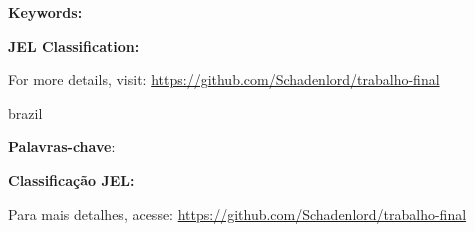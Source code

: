 \documentclass[
	article,
	12pt,
	oneside,
	a4paper,
	english,
	brazil,
	sumario=tradicional
]{abntex2}
\begin{document}
\frenchspacing

\maketitle
{}

	\begin{resumoumacoluna}
	\noindent
	
	
	\textbf{Keywords:} 
	
	\textbf{JEL Classification: }

	For more details, visit: \url{https://github.com/Schadenlord/trabalho-final}

	\end{resumoumacoluna}

\newpage

\renewcommand{\resumoname}{Resumo}
\begin{resumoumacoluna}
\begin{otherlanguage*}{brazil}
   \noindent 
   
   
   \textbf{Palavras-chave}: 
   
   \textbf{Classificação JEL:}

	   Para mais detalhes, acesse: \url{https://github.com/Schadenlord/trabalho-final}

 \end{otherlanguage*}  
\end{resumoumacoluna}

\newpage


\textual



\renewcommand{\refname}{Referências}


\end{document}
